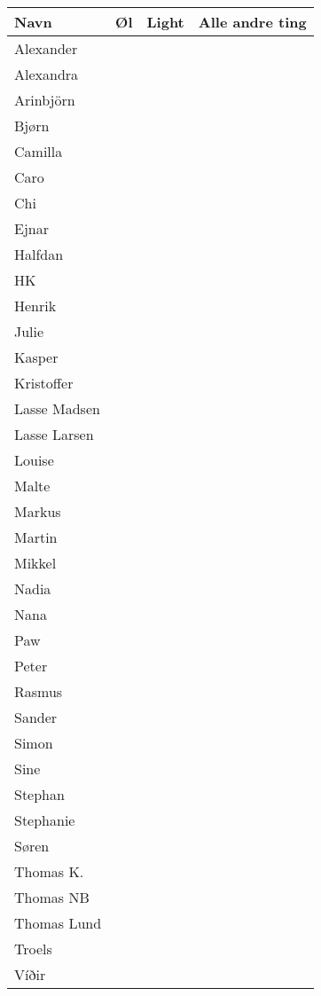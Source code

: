 \documentclass[10pt,a4paper,danish]{article}
\begin{document}
\resizebox{\textwidth}{!} {
\begin{tabular}[h!]{|l|p{}|c|c|}
\hline Navn & Øl & Light & Alle andre ting\\
\hline  Alexander & & &\\
\hline  Alexandra & & &\\
\hline  Arinbjörn & & &\\
\hline  Bjørn & & &\\
\hline  Camilla & & &\\
\hline  Caro & & &\\
\hline  Chi & & &\\
\hline  Ejnar & & &\\
\hline  Halfdan & & &\\
\hline  HK & & &\\
\hline  Henrik & & &\\
\hline  Julie & & &\\
\hline  Kasper & & &\\
\hline  Kristoffer & & &\\
\hline  Lasse Madsen & & &\\
\hline  Lasse Larsen & & &\\
\hline  Louise  & & &\\
\hline  Malte & & &\\
\hline  Markus & & &\\
\hline  Martin  & & &\\
\hline  Mikkel  & & &\\
\hline  Nadia  & & &\\
\hline  Nana  & & &\\
\hline  Paw & & &\\
\hline  Peter & & &\\
\hline  Rasmus & & &\\
\hline  Sander & & &\\
\hline  Simon & & &\\
\hline  Sine & & &\\
\hline  Stephan & & &\\
\hline  Stephanie & & &\\
\hline  Søren & & &\\
\hline  Thomas K. & & &\\
\hline  Thomas NB & & &\\
\hline  Thomas Lund & & &\\
\hline  Troels & & &\\
\hline  Víðir & & &\\
\hline\end{tabular}}
\end{document}
